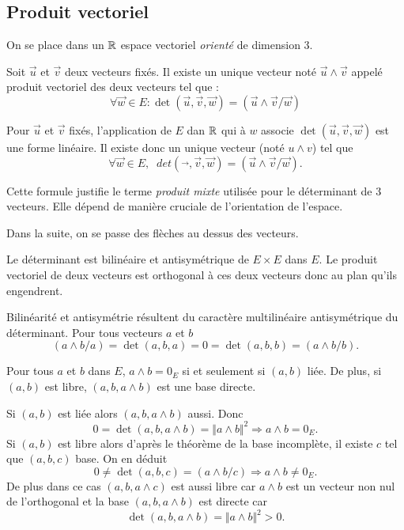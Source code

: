 \subsection{Produit vectoriel}
On se place dans un $\mathbb{R}$ espace vectoriel \emph{orienté} de dimension $3$.
\begin{propn}
 Soit $\overrightarrow{u}$ et $\overrightarrow{v}$ deux vecteurs fixés. Il existe un unique vecteur noté $\overrightarrow{u} \wedge \overrightarrow{v}$ appelé produit vectoriel des deux vecteurs tel que :
\begin{displaymath}
 \forall \overrightarrow w \in E : \det(\overrightarrow u , \overrightarrow v , \overrightarrow w)
=  \left(  \overrightarrow u \wedge \overrightarrow v / \overrightarrow w \right) 
\end{displaymath}
\end{propn}
\begin{demo}
 Pour $\overrightarrow u$ et $\overrightarrow v$ fixés, l'application de $E$ dan $\mathbb{R}$ qui à $w$ associe $\det(\overrightarrow u,\overrightarrow v,\overrightarrow w)$ est une forme linéaire. Il existe donc un unique vecteur (noté $u\wedge v$) tel que 
 \[
  \forall \overrightarrow w \in E,\; \; det(\overrightarrow{},\overrightarrow v,\overrightarrow w) = (\overrightarrow u \wedge \overrightarrow v / \overrightarrow w).
 \]
\end{demo}

Cette formule justifie le terme \emph{produit mixte} utilisée pour le déterminant de 3 vecteurs. Elle dépend de manière cruciale de l'orientation de l'espace.

Dans la suite, on se passe des flèches au dessus des vecteurs.
\begin{propn}
 Le déterminant est bilinéaire et antisymétrique de $E\times E$ dans $E$. Le produit vectoriel de deux vecteurs est orthogonal à ces deux vecteurs donc au plan qu'ils engendrent.
\end{propn}
\begin{demo}
 Bilinéarité et antisymétrie résultent du caractère multilinéaire antisymétrique du déterminant. Pour tous vecteurs $a$ et $b$
 \[
  (a\wedge b /a) = \det(a,b,a) = 0 = \det(a,b,b) = (a\wedge b / b).
 \]
\end{demo}

\begin{propn}
 Pour tous $a$ et $b$ dans $E$, $a \wedge b = 0_E$ si et seulement si $(a,b)$ liée. De plus, si $(a,b)$ est libre, $(a,b,a \wedge b)$ est une base directe.
\end{propn}
\begin{demo}
 Si $(a,b)$ est liée alors $(a,b,a\wedge b)$ aussi. Donc
 \[
  0 = \det(a,b,a\wedge b) = \Vert a\wedge b \Vert^2 \Rightarrow a\wedge b = 0_E.
 \]
Si $(a,b)$ est libre alors d'après le théorème de la base incomplète, il existe $c$ tel que $(a,b,c)$ base. On en déduit
\[
 0 \neq \det(a,b,c) = (a\wedge b / c) \Rightarrow a\wedge b \neq 0_E.
\]
De plus dans ce cas $(a,b,a\wedge c)$ est aussi libre car $a\wedge b$ est un vecteur non nul de l'orthogonal et la base $(a,b,a\wedge b)$ est directe car
\[
\det(a,b,a \wedge b) = \Vert a\wedge b \Vert^2 > 0. 
\]
\end{demo}

